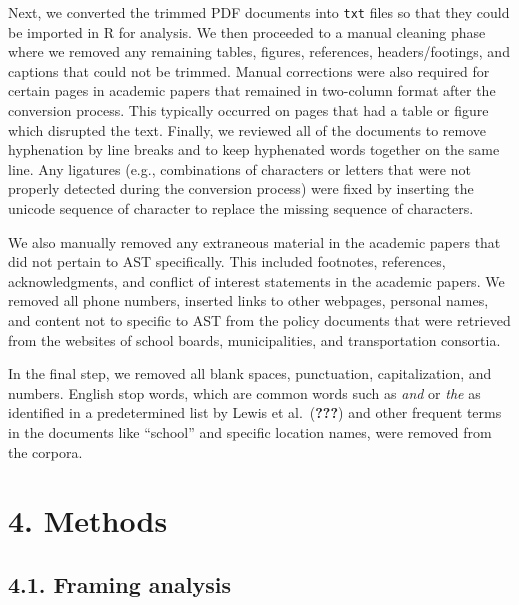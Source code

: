 \documentclass[]{elsarticle} %
\begin{document}
Next, we converted the trimmed PDF documents into \texttt{txt} files so
that they could be imported in R for analysis. We then proceeded to a
manual cleaning phase where we removed any remaining tables, figures,
references, headers/footings, and captions that could not be trimmed.
Manual corrections were also required for certain pages in academic
papers that remained in two-column format after the conversion process.
This typically occurred on pages that had a table or figure which
disrupted the text. Finally, we reviewed all of the documents to remove
hyphenation by line breaks and to keep hyphenated words together on the
same line. Any ligatures (e.g., combinations of characters or letters
that were not properly detected during the conversion process) were
fixed by inserting the unicode sequence of character to replace the
missing sequence of characters.

We also manually removed any extraneous material in the academic papers
that did not pertain to AST specifically. This included footnotes,
references, acknowledgments, and conflict of interest statements in the
academic papers. We removed all phone numbers, inserted links to other
webpages, personal names, and content not to specific to AST from the
policy documents that were retrieved from the websites of school boards,
municipalities, and transportation consortia.

In the final step, we removed all blank spaces, punctuation,
capitalization, and numbers. English stop words, which are common words
such as \emph{and} or \emph{the} as identified in a predetermined list
by Lewis et al.~({\textbf{???}}) and other frequent terms in the
documents like ``school'' and specific location names, were removed from
the corpora.

\hypertarget{methods}{%
\section{4. Methods}\label{methods}}

\hypertarget{framing-analysis}{%
\subsection{4.1. Framing analysis}\label{framing-analysis}}
\end{document}
